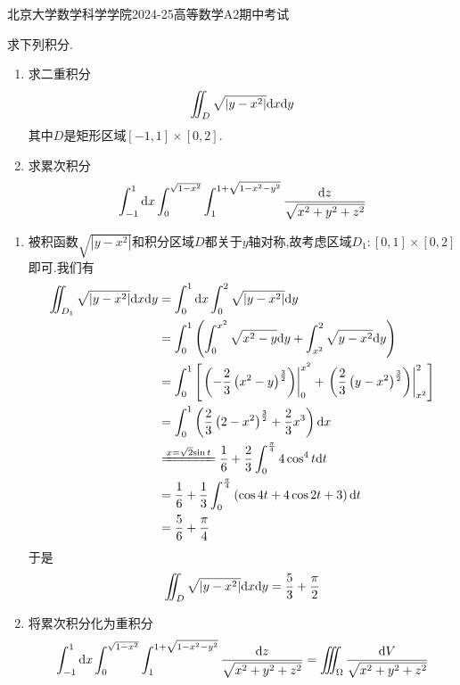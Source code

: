 \documentclass{ctexart}
\begin{document}
\pagestyle{empty}
\begin{center}\Large
    北京大学数学科学学院2024-25高等数学A2期中考试
\end{center}
\begin{problem}[1.(20\songti{分})]
    求下列积分.
    \begin{enumerate}[label=\tbf{(\arabic*)}]
        \item 求二重积分
            \[\iint_D\sqrt{\left|y-x^2\right|}\mathrm{d} x\mathrm{d} y\]
            其中$D$是矩形区域$[-1,1]\times[0,2]$.
        \item 求累次积分
            \[\int_{-1}^1\mathrm{d} x\int_0^{\sqrt{1-x^2}}\int_1^{1+\sqrt{1-x^2-y^2}}\dfrac{\mathrm{d} z}{\sqrt{x^2+y^2+z^2}}\]

    \end{enumerate}
\end{problem}
\begin{solution}
    \begin{enumerate}[label=\tbf{(\arabic*)}]
        \item 被积函数$\sqrt{\left|y-x^2\right|}$和积分区域$D$都关于$y$轴对称,故考虑区域$D_1:[0,1]\times[0,2]$即可.我们有
            \[\begin{aligned}
                \iint_{D_1}\sqrt{\left|y-x^2\right|}\dx\di y
                &= \int_0^1\dx\int_0^2\sqrt{\left|y-x^2\right|}\di y \\
                &= \int_0^1\left(\int_0^{x^2}\sqrt{x^2-y}\di y+\int_{x^2}^2\sqrt{y-x^2}\di y\right) \\
                &= \int_0^1\left[\left.\left(-\dfrac23\left(x^2-y\right)^{\frac32}\right)\right|_0^{x^2}+\left.\left(\dfrac23\left(y-x^2\right)^{\frac32}\right)\right|_{x^2}^2\right] \\
                &= \int_0^1\left(\dfrac23\left(2-x^2\right)^{\frac32}+\dfrac23x^3\right)\dx \\
                &\xlongequal{x=\sqrt2{\sin t}}\dfrac16+\dfrac23\int_0^{\frac\pi4}4\cos^4t\di t \\
                &= \dfrac16+\dfrac13\int_0^{\frac\pi4}\left(\cos4t+4\cos2t+3\right)\di t \\
                &= \dfrac56+\dfrac\pi4
            \end{aligned}\]
            于是
            \[\iint_D\sqrt{\left|y-x^2\right|}\mathrm{d} x\mathrm{d} y=\dfrac53+\dfrac\pi2\]
        \item 将累次积分化为重积分
            \[\int_{-1}^1\mathrm{d} x\int_0^{\sqrt{1-x^2}}\int_1^{1+\sqrt{1-x^2-y^2}}\dfrac{\mathrm{d} z}{\sqrt{x^2+y^2+z^2}}=\iiint_{\Omega}\dfrac{\mathrm{d} V}{\sqrt{x^2+y^2+z^2}}\]

\end{enumerate}
\end{solution}
\end{document}
